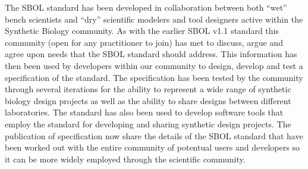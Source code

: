 The SBOL standard has been developed in collaboration between both ``wet'' bench scientists and ``dry'' scientific modelers and tool designers active within the Synthetic Biology community. 
As with the earlier SBOL v1.1 standard this community (open for any practitioner to join) has met to discuss, argue and agree upon needs that the SBOL standard should address. 
This information has then been used by developers within our community to design, develop and test a specification of the standard. The specification has been tested by the community through several iterations for the ability to represent a wide range of synthetic biology design projects as well as the ability to share designs between different laboratories. 
The standard has also been used to develop software tools that employ the standard for developing and sharing synthetic design projects. 
The publication of specification now share the details of the SBOL standard that have been worked out with the entire community of potentual users and developers so it can be more widely employed through the scientific community.

